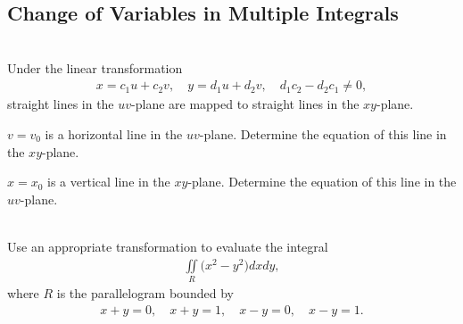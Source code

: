 \subsection{Change of Variables in Multiple Integrals}
\BEN
\item %
 \\
Under the linear transformation 
\begin{align*}
  x = c_1u + c_2v , \quad y =d_1u + d_2v, \quad d_1c_2 - d_2c_1 \ne 0,
\end{align*}
straight lines in the $uv$-plane are mapped to straight lines in the $xy$-plane. 
\BEN
\item $v=v_0$ is a horizontal line in the $uv$-plane. Determine the equation of this line in the $xy$-plane. 
\item $x=x_0$ is a vertical line in the $xy$-plane. Determine the equation of this line in the $uv$-plane.
\EEN
\item %
 \\
Use an appropriate transformation to evaluate the integral
\begin{align*}
  \iint\limits_R \big(x^2 - y^2\big) dxdy,
\end{align*}
where $R$ is the parallelogram bounded by 
\begin{align*}
  x+y = 0, \quad x+y = 1, \quad x-y=0, \quad x-y=1.
\end{align*}

